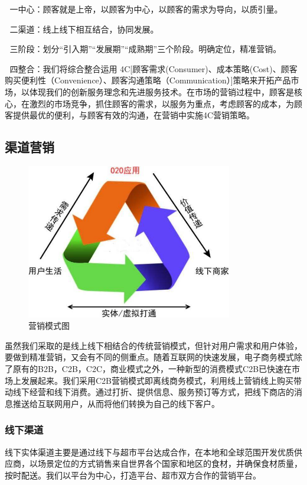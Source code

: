\documentclass[UTF8,12pt]{ctexart}
\numberwithin{figure}{section}%
\begin{document}
\begin{spacing}{2}
 一中心：顾客就是上帝，以顾客为中心，以顾客的需求为导向，以质引量。

 二渠道：线上线下相互结合，协同发展。 

 三阶段：划分“引入期”“发展期”“成熟期”三个阶段。明确定位，精准营销。 

 四整合：我们将综合整合运用 4C[顾客需求(Consumer)、成本策略(Cost)、顾客购买便利性（Convenience）、顾客沟通策略（Communication）]策略来开拓产品市场，以体现我们的创新服务理念和先进服务技术。在市场的营销过程中，顾客是核心，在激烈的市场竞争，抓住顾客的需求，以服务为重点，考虑顾客的成本，为顾客提供最优的便利，与顾客有效的沟通，在营销中实施4C营销策略。



\subsection{渠道营销}

\begin{figure}[H]
	\centering
	\includegraphics[width=9cm]{fig/22}
	\caption{营销模式图}
\end{figure}
虽然我们采取的是线上线下相结合的传统营销模式，但针对用户需求和用户体验，要做到精准营销，又会有不同的侧重点。随着互联网的快速发展，电子商务模式除了原有的B2B，C2B，C2C，商业模式之外，一种新型的消费模式C2B已快速在市场上发展起来。我们采用C2B营销模式即离线商务模式，利用线上营销线上购买带动线下经营和线下消费。通过打折、提供信息、服务预订等方式，把线下商店的消息推送给互联网用户，从而将他们转换为自己的线下客户。



\subsubsection{线下渠道}
线下实体渠道主要是通过线下与超市平台达成合作，在本地和全球范围开发优质供应商，以场景定位的方式销售来自世界各个国家和地区的食材，并确保食材质量，按时配送。我们以平台为中心，打造平台、超市双方合作的营销平台。


\end{spacing}
\end{document}
